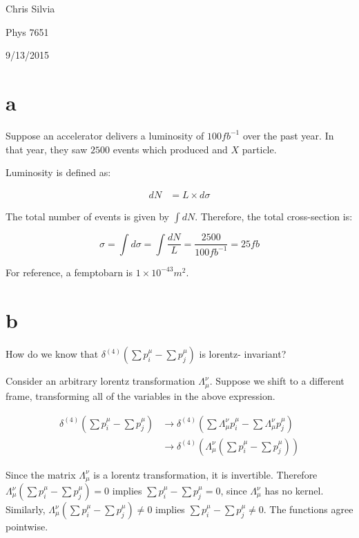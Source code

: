 \documentclass{article}
\begin{document}
\begin{flushright}
Chris Silvia

Phys 7651

9/13/2015
\end{flushright}

\section{a}

Suppose an accelerator delivers a luminosity of $100 fb^{-1}$
	over the past year.
In that year, they saw $2500$ events which produced and $X$ particle.

Luminosity is defined as:

\begin{align}
dN & = L \times d\sigma
\end{align}

The total number of events is given by $\int dN$.
Therefore, the total cross-section is:

$$ \sigma = \int d\sigma = \int \frac{dN}{L} = \frac{2500}{100 fb^{-1}} = 25 fb $$

For reference, a femptobarn is $1 \times 10^{-43} m^2$.

\section{b}

How do we know that $\delta^{(4)}( \sum p_i^\mu - \sum p_j^\mu )$ is lorentz-
	invariant?

Consider an arbitrary lorentz transformation $\Lambda^\nu_\mu$.
Suppose we shift to a different frame, transforming all of the variables
	in the above expression.

\begin{align*}
\delta^{(4)}( \sum p_i^\mu - \sum p_j^\mu ) & \to  
	\delta^{(4)}\left( \sum \Lambda_\mu^\nu p_i^\mu - \sum \Lambda_\mu^\nu p_j^\mu \right) \\
& \to  \delta^{(4)}\left( \Lambda_\mu^\nu \left( \sum p_i^\mu - \sum p_j^\mu \right) \right) 
\end{align*}

Since the matrix $\Lambda_\mu^\nu$ is a lorentz transformation,
	it is invertible.
Therefore $  \Lambda_\mu^\nu ( \sum p_i^\mu - \sum p_j^\mu ) = 0$
	implies $ \sum p_i^\mu - \sum p_j^\mu = 0$, since $\Lambda_\mu^\nu$
	has no kernel.
Similarly, $  \Lambda_\mu^\nu ( \sum p_i^\mu - \sum p_j^\mu ) \neq 0$
	implies $ \sum p_i^\mu - \sum p_j^\mu \neq 0$.
The functions agree pointwise.
\end{document}
